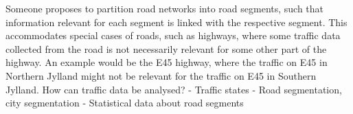 Someone proposes to partition road networks into road segments, such that information relevant for each segment is linked with the respective segment. This accommodates special cases of roads, such as highways, where some traffic data collected from the road is not necessarily relevant for some other part of the highway. An example would be the E45 highway, where the traffic on E45 in Northern Jylland might not be relevant for the traffic on E45 in Southern Jylland.
How can traffic data be analysed?
- Traffic states
- Road segmentation, city segmentation
- Statistical data about road segments 